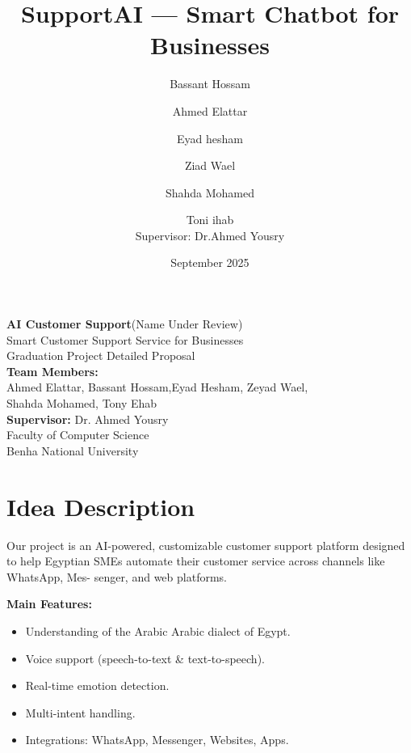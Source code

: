 \documentclass[20pt,a4paper]{article}
\title{\Huge\bfseries SupportAI --- Smart Chatbot for Businesses}
\author{Bassant Hossam \and Ahmed Elattar \and Eyad hesham \and Ziad Wael \and Shahda Mohamed \and Toni ihab\\[6pt]
\small Supervisor: Dr.Ahmed Yousry}
\date{September 2025}
\begin{document}
\begin{titlepage}
  \centering
  \vspace*{2cm}
  {\Huge\bfseries AI Customer Support}(Name Under Review)\\[6pt]
  {\Large Smart Customer Support Service for Businesses}\\[1.5cm]

  {\Large Graduation Project Detailed Proposal}\\[1cm]

  \textbf{Team Members:}\\
Ahmed Elattar, Bassant Hossam,Eyad Hesham, Zeyad Wael,\\ Shahda Mohamed, Tony Ehab\\[1cm]

  \textbf{Supervisor:} Dr. Ahmed Yousry\\[2cm]

  {\large Faculty of Computer Science}\\
  {\large Benha National University}\\[1cm]

  \vfill
\end{titlepage}

\setcounter{page}{1}
\tableofcontents
\clearpage
{}
\setcounter{page}{1}


\section{Idea Description}
Our project is an AI-powered, customizable customer support platform designed to help
Egyptian SMEs automate their customer service across channels like WhatsApp, Mes-
senger, and web platforms.

\textbf{Main Features:}
\begin{itemize}[noitemsep]
    \item Understanding of the Arabic Arabic dialect of Egypt.
    \item Voice support (speech-to-text \& text-to-speech).
    \item Real-time emotion detection.
    \item Multi-intent handling.
    \item Integrations: WhatsApp, Messenger, Websites, Apps.
\end{itemize}
\end{document}
